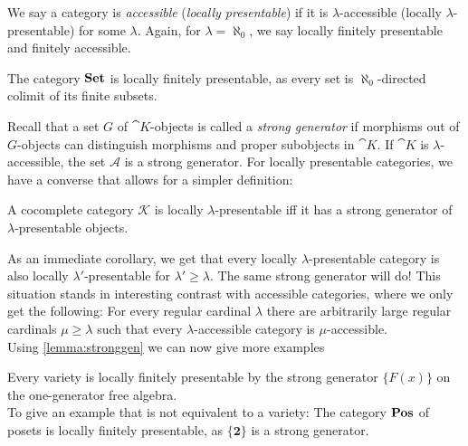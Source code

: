 We say a category is \emph{accessible} (\emph{locally presentable}) if it is $\lambda$-accessible (locally $\lambda$-presentable) for some $\lambda$. Again, for $\lambda = \aleph_0$, we say locally finitely presentable and finitely accessible. 

\begin{Example}
The category $\mathbf{Set}$ is locally finitely presentable, as every set is $\aleph_0$-directed colimit of its finite subsets.
\end{Example}

Recall that a set $G$ of $\cat K$-objects is called a \emph{strong generator} if morphisms out of $G$-objects can distinguish morphisms and proper subobjects in $\cat K$. If $\cat K$ is $\lambda$-accessible, the set $\mathcal A$ is a strong generator. For locally presentable categories, we have a converse that allows for a simpler definition:

\begin{Lemma}\label{lemma:stronggen}
A cocomplete category $\mathcal K$ is locally $\lambda$-presentable iff it has a strong generator of $\lambda$-presentable objects. 
\end{Lemma}

As an immediate corollary, we get that every locally $\lambda$-presentable category is also locally $\lambda'$-presentable for $\lambda' \geq \lambda$. The same strong generator will do! This situation stands in interesting contrast with accessible categories, where we only get the following: For every regular cardinal $\lambda$ there are arbitrarily large regular cardinals $\mu \geq \lambda$ such that every $\lambda$-accessible category is $\mu$-accessible. \\

Using \ref{lemma:stronggen} we can now give more examples

\begin{Example}
Every variety is locally finitely presentable by the strong generator $\{ F(x) \}$ on the one-generator free algebra. \\

To give an example that is not equivalent to a variety: The category $\mathbf{Pos}$ of posets is locally finitely presentable, as $\{\mathbf 2\}$ is a strong generator. %
\end{Example}



